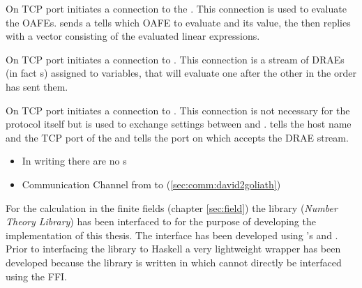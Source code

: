 \label{sec:comm:david2token}

On TCP port  \JWpTwo{} initiates a connection to the \JWtoken{}.
This connection is used to evaluate the OAFEs. \JWpTwo{} sends a tells which
OAFE to evaluate and its value, the \JWtoken{} then replies with a vector
consisting of the evaluated linear expressions.


\label{sec:comm:goliath2david}

On TCP port  \JWpOne{} initiates a connection to \JWpTwo{}. This
connection is a stream of \JWpTwo{} DRAEs (in fact s) assigned to
variables, that \JWpTwo{} will evaluate one after the other in the order
\JWpOne{} has sent them.


\label{sec:comm:david2goliath}

On TCP port  \JWpTwo{} initiates a connection to \JWpOne{}. This
connection is not necessary for the protocol itself but is used to exchange
settings between \JWpOne{} and \JWpTwo{}. \JWpOne{} tells \JWpTwo{} the host
name and the TCP port of the \JWtoken{} and \JWpTwo{} tells \JWpOne{} the port
on which \JWpTwo{} accepts the DRAE stream.


%
%
\label{sec:implementation-differences}

\begin{itemize}

\item In writing there are no s

\item Communication Channel from \JWpTwo{} to \JWpOne{}
(\ref{sec:comm:david2goliath})

\end{itemize}


%
%
\label{sec:implementation-details}


For the calculation in the finite fields (chapter \ref{sec:field}) the
\JWTcpp{} library \JWTLntl{} (\emph{Number Theory Library}) has been interfaced
to \JWThaskell{} for the purpose of developing the implementation of this
thesis. The interface has been developed using \JWThaskell{}'s  \cite{haskell2010} and  \cite{c2hs}. Prior to interfacing the library to Haskell a very
lightweight \JWTc{} wrapper has been developed because the library is written in
\JWTcpp{} which cannot directly be interfaced using the FFI.


